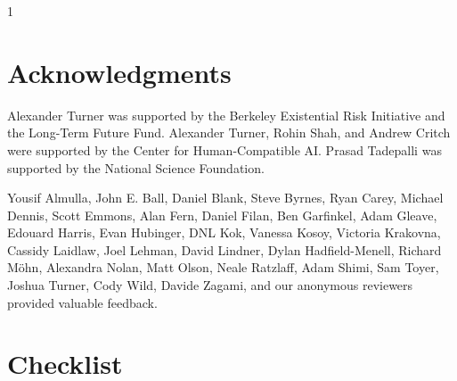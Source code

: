 \documentclass{article}
\def\isfinal{1}
\theoremstyle{definition}
\begin{document}
\if\isfinal1
\section*{Acknowledgments}
Alexander Turner was supported by the Berkeley Existential Risk Initiative and the Long-Term Future Fund. Alexander Turner, Rohin Shah, and Andrew Critch were supported by the Center for Human-Compatible AI. Prasad Tadepalli was supported by the National Science Foundation.

Yousif Almulla, John E. Ball, Daniel Blank, Steve Byrnes, Ryan Carey, Michael Dennis, Scott Emmons, Alan Fern, Daniel Filan, Ben Garfinkel, Adam Gleave, Edouard Harris, Evan Hubinger,  DNL Kok, Vanessa Kosoy, Victoria Krakovna, Cassidy Laidlaw, Joel Lehman, David Lindner, Dylan Hadfield-Menell, Richard Möhn, Alexandra Nolan, Matt Olson, Neale Ratzlaff, Adam Shimi, Sam Toyer, Joshua Turner, Cody Wild, Davide Zagami, and our anonymous reviewers provided valuable feedback.
\fi


{\small}

%
\section*{Checklist}
\end{document}
